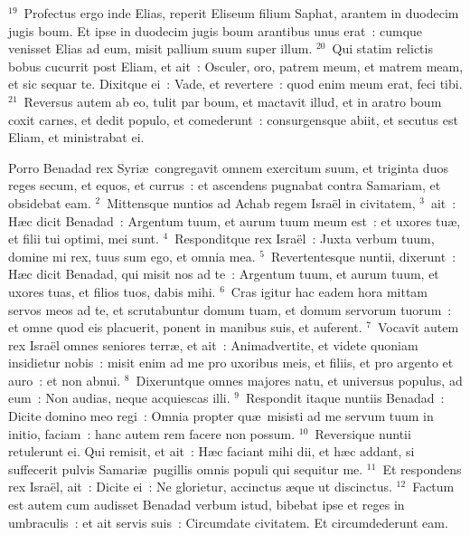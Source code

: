 ${}^{19}$~Profectus ergo inde Elias, reperit Eliseum filium Saphat, arantem in duodecim jugis boum. Et ipse in duodecim jugis boum arantibus unus erat~: cumque venisset Elias ad eum, misit pallium suum super illum.
${}^{20}$~Qui statim relictis bobus cucurrit post Eliam, et ait~: Osculer, oro, patrem meum, et matrem meam, et sic sequar te. Dixitque ei~: Vade, et revertere~: quod enim meum erat, feci tibi.
${}^{21}$~Reversus autem ab eo, tulit par boum, et mactavit illud, et in aratro boum coxit carnes, et dedit populo, et comederunt~: consurgensque abiit, et secutus est Eliam, et ministrabat ei.

\lettrine[lines=10,image=true,loversize=0.05,lraise=-0.03]{P}{}orro Benadad rex Syri\ae\ congregavit omnem exercitum suum, et triginta duos reges secum, et equos, et currus~: et ascendens pugnabat contra Samariam, et obsidebat eam.
${}^{2}$~Mittensque nuntios ad Achab regem Isra\"el in civitatem,
${}^{3}$~ait~: H\ae c dicit Benadad~: Argentum tuum, et aurum tuum meum est~: et uxores tu\ae , et filii tui optimi, mei sunt.
${}^{4}$~Responditque rex Isra\"el~: Juxta verbum tuum, domine mi rex, tuus sum ego, et omnia mea.
${}^{5}$~Revertentesque nuntii, dixerunt~: H\ae c dicit Benadad, qui misit nos ad te~: Argentum tuum, et aurum tuum, et uxores tuas, et filios tuos, dabis mihi.
${}^{6}$~Cras igitur hac eadem hora mittam servos meos ad te, et scrutabuntur domum tuam, et domum servorum tuorum~: et omne quod eis placuerit, ponent in manibus suis, et auferent.
${}^{7}$~Vocavit autem rex Isra\"el omnes seniores terr\ae , et ait~: Animadvertite, et videte quoniam insidietur nobis~: misit enim ad me pro uxoribus meis, et filiis, et pro argento et auro~: et non abnui.
${}^{8}$~Dixeruntque omnes majores natu, et universus populus, ad eum~: Non audias, neque acquiescas illi.
${}^{9}$~Respondit itaque nuntiis Benadad~: Dicite domino meo regi~: Omnia propter qu\ae\ misisti ad me servum tuum in initio, faciam~: hanc autem rem facere non possum.
${}^{10}$~Reversique nuntii retulerunt ei. Qui remisit, et ait~: H\ae c faciant mihi dii, et h\ae c addant, si suffecerit pulvis Samari\ae\ pugillis omnis populi qui sequitur me.
${}^{11}$~Et respondens rex Isra\"el, ait~: Dicite ei~: Ne glorietur, accinctus \ae que ut discinctus.
${}^{12}$~Factum est autem cum audisset Benadad verbum istud, bibebat ipse et reges in umbraculis~: et ait servis suis~: Circumdate civitatem. Et circumdederunt eam.


